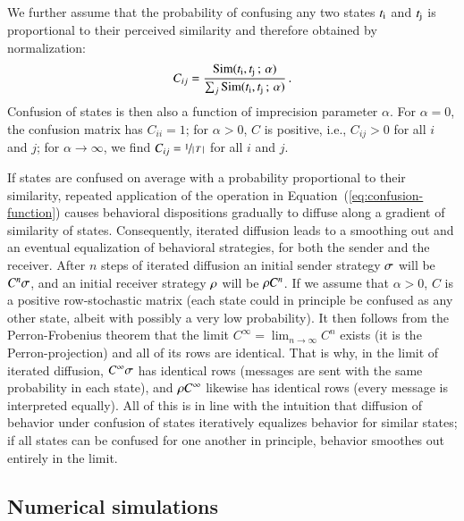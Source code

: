\documentclass[fleqn,reqno,10pt]{article}
\newcommand{\impairment}{\ensuremath{\alpha}} %
\newcommand{\similarity}{\ensuremath{\mathrm{Sim}}} %
\begin{document}
We further assume that the probability of confusing any two states
$t_{\mathrm{i}}$ and $t_{\mathrm{j}}$ is proportional to their perceived
similarity and therefore obtained by normalization:
\begin{align*}
  C_{ij} = \frac{\similarity(\mystate{i}, \mystate{j} \myts ; \myts
  \impairment)} {\sum_j \similarity(\mystate{i}, \mystate{j} \myts ; \myts
  \impairment)} \,.
\end{align*}
Confusion of states is then also a function of imprecision parameter
$\impairment$. For $\impairment = 0$, the confusion matrix has $C_{ii}
= 1$; for $\impairment > 0$, $C$ is positive, i.e., $C_{ij} >0$ for
all $i$ and $j$; for $\impairment \rightarrow \infty$, we find $C_{ij}
= \nicefrac{1}{\left \lvert \, T \, \right\rvert}$ for all $i$ and $j$.

If states are confused on average with a probability proportional to
their similarity, repeated application of the operation in
Equation~(\ref{eq:confusion-function}) causes behavioral dispositions
gradually to diffuse along a gradient of similarity of
states. Consequently, iterated diffusion leads to a smoothing out and
an eventual equalization of behavioral strategies, for both the sender
and the receiver. After $n$ steps of iterated diffusion an initial
sender strategy $\sigma$ will be $C^n \sigma$, and an initial
receiver strategy $\rho$ will be $\rho C^n$. If we assume that
$\impairment > 0$, $C$ is a positive row-stochastic matrix (each state
could in principle be confused as any other state, albeit with
possibly a very low probability). It then follows from the
Perron-Frobenius theorem that the limit $C^\infty = \lim_{n
  \rightarrow \infty} C^n$ exists (it is the Perron-projection) and
all of its rows are identical. That is why, in the limit of iterated
diffusion, $C^\infty \sigma$ has identical rows (messages are sent
with the same probability in each state), and $\rho C^\infty$
likewise has identical rows (every message is interpreted
equally). All of this is in line with the intuition that diffusion of
behavior under confusion of states iteratively equalizes behavior for
similar states; if all states can be confused for one another in
principle, behavior smoothes out entirely in the limit.

\subsection{Numerical simulations}
\label{sec:simulations}
\end{document}
